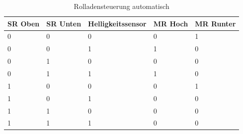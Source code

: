 \begin{table}[]
\centering
\caption{Rolladensteuerung automatisch}
\label{my-label}
\begin{tabular}{|l|l|l|l|l|}
\hline
\multicolumn{1}{|c|}{\textbf{SR Oben}} & \multicolumn{1}{c|}{\textbf{SR Unten}} & \multicolumn{1}{c|}{\textbf{Helligkeitssensor}} & \multicolumn{1}{c|}{\textbf{MR Hoch}} & \multicolumn{1}{c|}{\textbf{MR Runter}} \\ \hline
0 & 0 & 0 & 0 & 1 \\ \hline
0 & 0 & 1 & 1 & 0 \\ \hline
0 & 1 & 0 & 0 & 0 \\ \hline
0 & 1 & 1 & 1 & 0 \\ \hline
1 & 0 & 0 & 0 & 1 \\ \hline
1 & 0 & 1 & 0 & 0 \\ \hline
1 & 1 & 0 & 0 & 0 \\ \hline
1 & 1 & 1 & 0 & 0 \\ \hline
\end{tabular}
\end{table}
